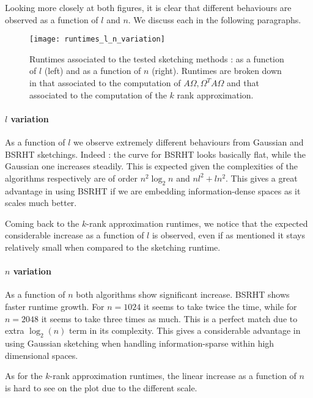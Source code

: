 \documentclass[a4paper, 12pt,oneside]{article}
\begin{document}
		Looking more closely at both figures, it is clear that different behaviours are observed as a function of $l$ and $n$. We discuss each in the following paragraphs.
		\begin{figure}[htb]       
			\centering             
				\vspace{0em}
				\texttt{[image: runtimes\_l\_n\_variation]}
				\caption{Runtimes associated to the tested sketching methods : as a function of $l$ (left) and as a function of $n$ (right). Runtimes are broken down in that associated to the computation of $A\Omega,\Omega^T A\Omega$ and that associated to the computation of the $k$ rank approximation.}
				\label{fig:runtimes-l-n-variation}
		\end{figure}
		\paragraph{$l$ variation}
		As a function of $l$ we observe extremely different behaviours from Gaussian and BSRHT sketchings. Indeed : the curve for BSRHT looks basically flat, while the Gaussian one increases steadily. This is expected given the complexities of the algorithms respectively are of order $n^2\log_2{n}$ and $nl^2 + ln^2$. This gives a great advantage in using BSRHT if we are embedding information-dense spaces as it scales much better.		

		Coming back to the $k$-rank approximation runtimes, we notice that the expected considerable increase as a function of $l$ is observed, even if as mentioned it stays relatively small when compared to the sketching runtime.
		\paragraph{$n$ variation}
		As a function of $n$ both algorithms show significant increase. BSRHT shows faster runtime growth. For $n=1024$ it seems to take twice the time, while for $n=2048$ it seems to take three times as much. This is a perfect match due to extra $\log_2(n)$ term in its complexity. This gives a considerable advantage in using Gaussian sketching when handling information-sparse within high dimensional spaces.

		As for the $k$-rank approximation runtimes, the linear increase as a function of $n$ is hard to see on the plot due to the different scale. 
\end{document}

